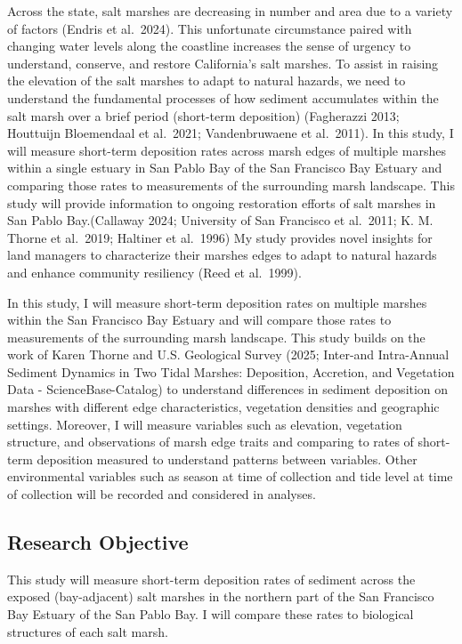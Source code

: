 \documentclass[
]{article}
\begin{document}
Across the state, salt marshes are decreasing in number and area due to
a variety of factors (Endris et al.~2024). This unfortunate circumstance
paired with changing water levels along the coastline increases the
sense of urgency to understand, conserve, and restore California's salt
marshes. To assist in raising the elevation of the salt marshes to adapt
to natural hazards, we need to understand the fundamental processes of
how sediment accumulates within the salt marsh over a brief period
(short-term deposition) (Fagherazzi 2013; Houttuijn Bloemendaal et
al.~2021; Vandenbruwaene et al.~2011). In this study, I will measure
short-term deposition rates across marsh edges of multiple marshes
within a single estuary in San Pablo Bay of the San Francisco Bay
Estuary and comparing those rates to measurements of the surrounding
marsh landscape. This study will provide information to ongoing
restoration efforts of salt marshes in San Pablo Bay.(Callaway 2024;
University of San Francisco et al.~2011; K. M. Thorne et al.~2019;
Haltiner et al.~1996) My study provides novel insights for land managers
to characterize their marshes edges to adapt to natural hazards and
enhance community resiliency (Reed et al.~1999).

In this study, I will measure short-term deposition rates on multiple
marshes within the San Francisco Bay Estuary and will compare those
rates to measurements of the surrounding marsh landscape. This study
builds on the work of Karen Thorne and U.S. Geological Survey (2025;
Inter-and Intra-Annual Sediment Dynamics in Two Tidal Marshes:
Deposition, Accretion, and Vegetation Data - ScienceBase-Catalog) to
understand differences in sediment deposition on marshes with different
edge characteristics, vegetation densities and geographic settings.
Moreover, I will measure variables such as elevation, vegetation
structure, and observations of marsh edge traits and comparing to rates
of short-term deposition measured to understand patterns between
variables. Other environmental variables such as season at time of
collection and tide level at time of collection will be recorded and
considered in analyses.

\subsection{Research Objective}\label{research-objective}

This study will measure short-term deposition rates of sediment across
the exposed (bay-adjacent) salt marshes in the northern part of the San
Francisco Bay Estuary of the San Pablo Bay. I will compare these rates
to biological structures of each salt marsh.
\end{document}
